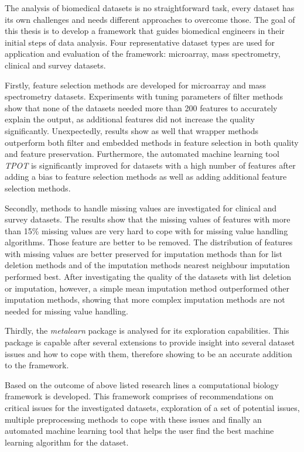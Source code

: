 \documentclass[10pt,a4paper]{report}
\begin{document}
	The analysis of biomedical datasets is no straightforward task, every dataset has its own challenges and needs different approaches to overcome those. The goal of this thesis is to develop a framework that guides biomedical engineers in their initial steps of data analysis. Four representative dataset types are used for application and evaluation of the framework: microarray, mass spectrometry, clinical and survey datasets. 
	
	Firstly, feature selection methods are developed for microarray and mass spectrometry datasets. Experiments with tuning parameters of filter methods show that none of the datasets needed more than 200 features to accurately explain the output, as additional features did not increase the quality significantly. Unexpectedly, results show as well that wrapper methods outperform both filter and embedded methods in feature selection in both quality and feature preservation. Furthermore, the automated machine learning tool \textit{TPOT} is significantly improved for datasets with a high number of features after adding a bias to feature selection methods as well as adding additional feature selection methods.
	
	Secondly, methods to handle missing values are investigated for clinical and survey datasets. The results show that the missing values of features with more than 15\% missing values are very hard to cope with for missing value handling algorithms. Those feature are better to be removed. The distribution of features with missing values are better preserved for imputation methods than for list deletion methods and of the imputation methods nearest neighbour imputation performed best. After investigating the quality of the datasets with list deletion or imputation, however, a simple mean imputation method outperformed other imputation methods, showing that more complex imputation methods are not needed for missing value handling.
	
	Thirdly, the \textit{metalearn} package is analysed for its exploration capabilities. This package is capable after several extensions to provide insight into several dataset issues and how to cope with them, therefore showing to be an accurate addition to the framework.
	
	Based on the outcome of above listed research lines a computational biology framework is developed. This framework comprises of recommendations on critical issues for the investigated datasets, exploration of a set of potential issues, multiple preprocessing methods to cope with these issues and finally an automated machine learning tool that helps the user find the best machine learning algorithm for the dataset.
	
\end{document}
